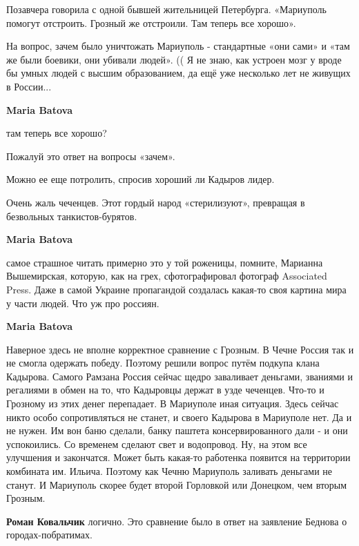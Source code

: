 \begin{itemize}

Позавчера говорила с одной бывшей жительницей Петербурга. «Мариуполь помогут
отстроить. Грозный же отстроили. Там теперь все хорошо».

На вопрос, зачем было уничтожать Мариуполь - стандартные «они сами» и «там же
были боевики, они убивали людей». (( Я не знаю, как устроен мозг у вроде бы
умных людей с высшим образованием, да ещё уже несколько лет не живущих в
России...

\begin{itemize} %
\textbf{Maria Batova} 

там теперь все хорошо?

Пожалуй это ответ на вопросы «зачем».

Можно ее еще потролить, спросив хороший ли Кадыров лидер.

Очень жаль чеченцев. Этот гордый народ «стерилизуют», превращая в безвольных
танкистов-бурятов.

\textbf{Maria Batova} 

самое страшное читать примерно это у той роженицы, помните, Марианна
Вышемирская, которую, как на грех, сфотографировал фотограф Associated Press.
Даже в самой Украине пропагандой создалась какая-то своя картина мира у части
людей. Что уж про россиян.

\textbf{Maria Batova} 

Наверное здесь не вполне корректное сравнение с Грозным. В Чечне Россия так и
не смогла одержать победу. Поэтому решили вопрос путём подкупа клана Кадырова.
Самого Рамзана Россия сейчас щедро заваливает деньгами, званиями и регалиями в
обмен на то, что Кадыровцы держат в узде чеченцев. Что-то и Грозному из этих
денег перепадает. В Мариуполе иная ситуация. Здесь сейчас никто особо
сопротивляться не станет, и своего Кадырова в Мариуполе нет. Да и не нужен. Им
вон баню сделали, банку паштета консервированного дали - и они успокоились. Со
временем сделают свет и водопровод. Ну, на этом все улучшения и закончатся.
Может быть какая-то работенка появится на территории комбината им. Ильича.
Поэтому как Чечню Мариуполь заливать деньгами не станут. И Мариуполь скорее
будет второй Горловкой или Донецком, чем вторым Грозным.

\textbf{Роман Ковальчик} логично. Это сравнение было в ответ на заявление Беднова о городах-побратимах.
\end{itemize} %


\end{itemize}
